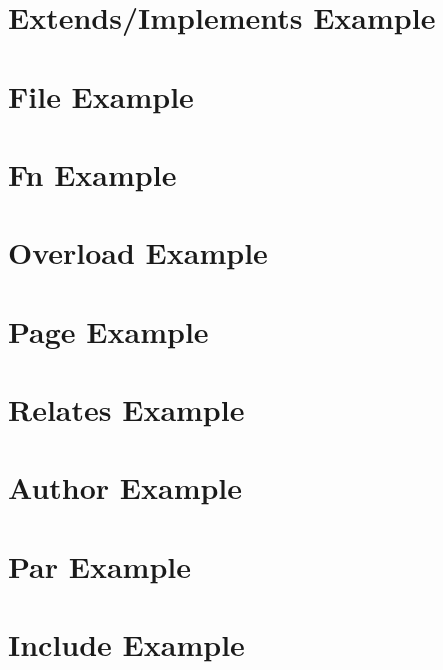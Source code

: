 \documentclass{book}
\newcommand{\+}{\discretionary{\mbox{\scriptsize$\hookleftarrow$}}{}{}}
\begin{document}
\chapter{Extends/Implements Example}\label{extends_example}\hypertarget{extends_example}{}
\chapter{File Example}\label{file_example}\hypertarget{file_example}{}
\chapter{Fn Example}\label{fn_example}\hypertarget{fn_example}{}
\chapter{Overload Example}\label{overload_example}\hypertarget{overload_example}{}
\chapter{Page Example}\label{page_example}\hypertarget{page_example}{}
\chapter{Relates Example}\label{relates_example}\hypertarget{relates_example}{}
\chapter{Author Example}\label{author_example}\hypertarget{author_example}{}
\chapter{Par Example}\label{par_example}\hypertarget{par_example}{}
\chapter{Include Example}\label{include_example}\hypertarget{include_example}{}


\printindex
\end{document}
